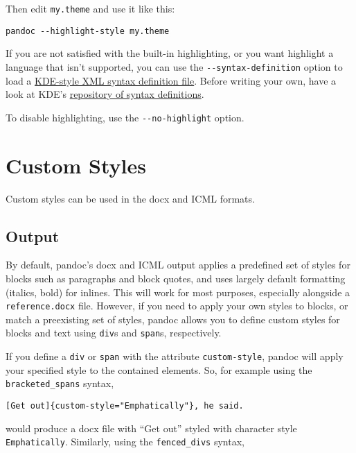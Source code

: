 \documentclass[
  12pt,
  a4paper,
]{article}
\begin{document}
Then edit \texttt{my.theme} and use it like this:

\begin{verbatim}
pandoc --highlight-style my.theme
\end{verbatim}

If you are not satisfied with the built-in highlighting, or you want highlight a language that
isn't supported, you can use the \texttt{-\/-syntax-definition} option to load a
\href{https://docs.kde.org/stable5/en/applications/katepart/highlight.html}{KDE-style XML syntax
definition file}. Before writing your own, have a look at KDE's
\href{https://github.com/KDE/syntax-highlighting/tree/master/data/syntax}{repository of syntax
definitions}.

To disable highlighting, use the \texttt{-\/-no-highlight} option.

\hypertarget{custom-styles}{%
\section{Custom Styles}\label{custom-styles}}

Custom styles can be used in the docx and ICML formats.

\hypertarget{output}{%
\subsection{Output}\label{output}}

By default, pandoc's docx and ICML output applies a predefined set of styles for blocks such as
paragraphs and block quotes, and uses largely default formatting (italics, bold) for inlines. This
will work for most purposes, especially alongside a \texttt{reference.docx} file. However, if you
need to apply your own styles to blocks, or match a preexisting set of styles, pandoc allows you
to define custom styles for blocks and text using \texttt{div}s and \texttt{span}s, respectively.

If you define a \texttt{div} or \texttt{span} with the attribute \texttt{custom-style}, pandoc
will apply your specified style to the contained elements. So, for example using the
\texttt{bracketed\_spans} syntax,

\begin{verbatim}
[Get out]{custom-style="Emphatically"}, he said.
\end{verbatim}

would produce a docx file with ``Get out'' styled with character style \texttt{Emphatically}.
Similarly, using the \texttt{fenced\_divs} syntax,
\end{document}
